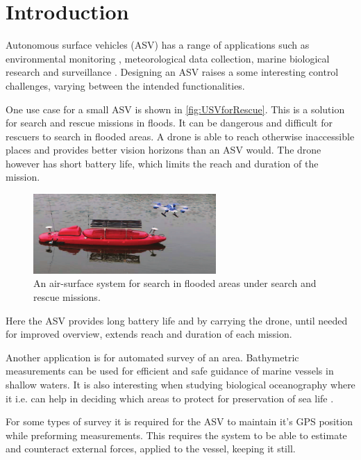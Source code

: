 \chapter{Introduction}

Autonomous surface vehicles (ASV) has a range of applications such as environmental monitoring \cite[p. 745]{MAHsieh}, meteorological data collection, marine biological research and surveillance \cite[p. 8-10]{FFahimi}.
Designing an ASV raises a some interesting control challenges, varying between the intended functionalities.

One use case for a small ASV is shown in \autoref{fig:USVforRescue}. This is a solution for search and rescue missions in floods. It can be dangerous and difficult for rescuers to search in flooded areas. A drone is able to reach otherwise inaccessible places and provides better vision horizons than an ASV would. The drone however has short battery life, which limits the reach and duration of the mission.
%
\begin{figure}[H]
  \vspace{3mm}
  \includegraphics[width=0.62\textwidth]{figures/USVforRescue.pdf}
  \caption{An air-surface system for search in flooded areas under search and rescue missions.\cite{JZhang}}
  \label{fig:USVforRescue}
\end{figure}
\vspace{-6mm}
%
Here the ASV provides long battery life and by carrying the drone, until needed for improved overview, extends reach and duration of each mission.\cite{JZhang}



Another application is for automated survey of an area.
Bathymetric measurements can be used for efficient and safe guidance of marine vessels in shallow waters. 
It is also interesting when studying biological oceanography where it i.e. can help in deciding which areas to protect for preservation of sea life \cite{NOService}. 

For some types of survey it is required for the ASV to maintain it's GPS position while preforming measurements. 
This requires the system to be able to estimate and counteract external forces, applied to the vessel, keeping it still. 

